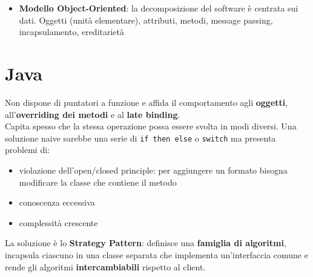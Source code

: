 \documentclass[12pt]{extarticle}
\begin{document}
\begin{itemize}
\begin{figure}[htbp]
\caption{Confronto tra architettura Data-Flow generica (a grafo) e architettura Batch (sequenziale pura).}
\label{fig:data_flow_topologies}
\end{figure}

    \item \textbf{Modello Object-Oriented}: la decomposizione del software è centrata sui dati. Oggetti (unità elementare), attributi, metodi, message passing, incapsulamento, ereditarietà
\end{itemize}

\newpage

\section{Java} Non dispone di puntatori a funzione e affida il comportamento agli \textbf{oggetti}, all'\textbf{overriding dei metodi} e al \textbf{late binding}.\\

\noindent Capita spesso che la stessa operazione possa essere svolta in modi diversi. Una soluzione naive sarebbe una serie di \texttt{if then else} o \texttt{switch} ma presenta problemi di:
\begin{itemize}
    \item violazione dell'open/closed principle: per aggiungere un formato bisogna modificare la classe che contiene il metodo
    \item conoscenza eccessiva
    \item complessità crescente
\end{itemize}

\noindent La soluzione è lo \textbf{Strategy Pattern}: definisce una \textbf{famiglia di algoritmi}, incapsula ciascuno in una classe separata che implementa un'interfaccia comune e rende gli algoritmi \textbf{intercambiabili} rispetto al client.
\end{document}
